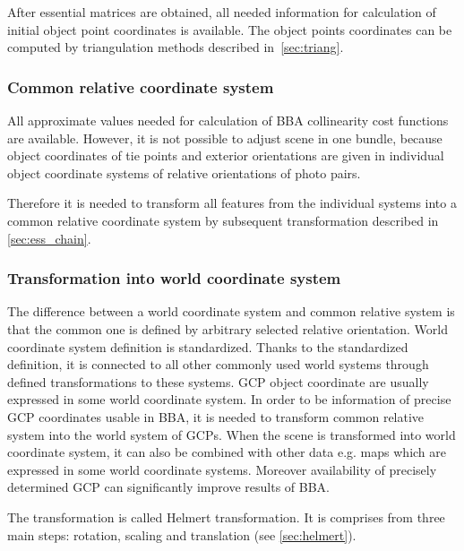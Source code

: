 \documentclass[a4paper,12pt]{article}
\begin{document}
After essential matrices are obtained, all needed information for calculation of initial object point coordinates
is  available. The object points coordinates can be computed by triangulation methods described in~\ref{sec:triang}.


\subsubsection{Common relative coordinate system}

All approximate values needed for calculation of BBA collinearity cost functions are available. 
However, it is not possible to adjust scene in one bundle, because
object coordinates of tie points and exterior orientations are given in individual object coordinate systems
of relative orientations of photo pairs.

Therefore it is needed to transform all features from the individual systems into 
a common relative coordinate system by subsequent transformation described in \ref{sec:ess_chain}. 

\subsubsection{Transformation into world coordinate system}


The difference between a world coordinate system and common relative system is that the common one 
is defined by arbitrary selected relative orientation. World coordinate system definition is standardized.
Thanks to the standardized definition, it is connected to all other commonly used  world systems through 
defined transformations to these systems.
GCP object coordinate are usually expressed in some world coordinate system. In order to be 
information of precise GCP coordinates usable in BBA, it is needed to transform common relative 
system into the world system of GCPs. When the scene is transformed into world coordinate system,
it can also be combined with other data e.g. maps 
which are expressed in some world coordinate systems. 
Moreover availability of precisely determined GCP can significantly improve results of BBA.  


The transformation is called Helmert transformation. It is comprises from 
three main steps: rotation, scaling and translation (see \ref{sec:helmert}).
\end{document}
